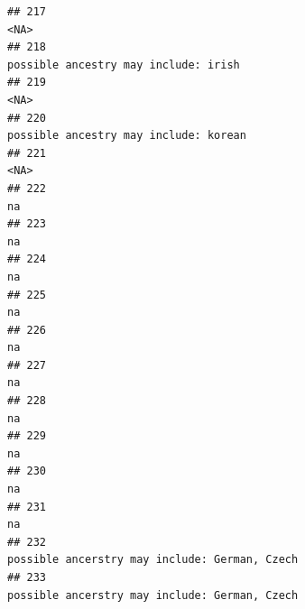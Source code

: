 \documentclass[]{article}
\begin{document}
\begin{verbatim}
## 217                                                                                                                                                <NA>
## 218                                                                                                                possible ancestry may include: irish
## 219                                                                                                                                                <NA>
## 220                                                                                                               possible ancestry may include: korean
## 221                                                                                                                                                <NA>
## 222                                                                                                                                                  na
## 223                                                                                                                                                  na
## 224                                                                                                                                                  na
## 225                                                                                                                                                  na
## 226                                                                                                                                                  na
## 227                                                                                                                                                  na
## 228                                                                                                                                                  na
## 229                                                                                                                                                  na
## 230                                                                                                                                                  na
## 231                                                                                                                                                  na
## 232                                                                                                       possible ancerstry may include: German, Czech
## 233                                                                                                       possible ancerstry may include: German, Czech

\end{verbatim}
\end{document}
